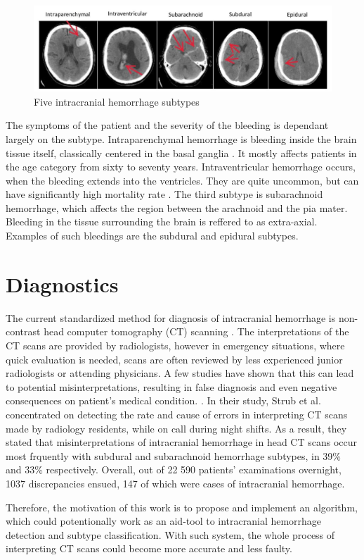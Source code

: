 \begin{figure}[h]
\begin{centering}
\includegraphics[width=14cm]{assets/images/subtypes}
\par\end{centering}
\caption{Five intracranial hemorrhage subtypes \label{fig:subtypes}}
\end{figure}

The symptoms of the patient and the severity of the bleeding is dependant largely on the subtype. Intraparenchymal hemorrhage is bleeding inside the brain tissue itself, classically centered in the basal ganglia \cite{imagingICH}. It mostly affects patients in the age category from sixty to seventy years. Intraventricular hemorrhage occurs, when the bleeding extends into the ventricles. They are quite uncommon, but can have significantly high mortality rate \cite{neuroimagingInTraumaticImageing}. The third subtype is subarachnoid hemorrhage, which affects the region between the arachnoid and the pia mater. Bleeding in the tissue surrounding the brain is reffered to as extra-axial. Examples of such bleedings are the subdural and epidural subtypes.

\section{Diagnostics}
The current standardized method for diagnosis of intracranial hemorrhage is non-contrast head computer tomography (CT) scanning \cite{imagingICH}. The interpretations of the CT scans are provided by radiologists, however in emergency situations, where quick evaluation is needed, scans are often reviewed by less experienced junior radiologists or attending physicians. A few studies have shown that this can lead to potential misinterpretations, resulting in false diagnosis and even negative consequences on patient's medical condition.  \cite{residentEval, overnightCTinterpret}. In their study, Strub et al. \cite{overnightCTinterpret} concentrated on detecting the rate and cause of errors in interpreting CT scans made by radiology residents, while on call during night shifts. As a result, they stated that misinterpretations of intracranial hemorrhage in head CT scans occur most frquently with subdural and subarachnoid hemorrhage subtypes, in 39\% and 33\% respectively. Overall, out of 22 590 patients' examinations overnight, 1037 discrepancies ensued, 147 of which were cases of intracranial hemorrhage.

Therefore, the motivation of this work is to propose and implement an algorithm, which could potentionally work as an aid-tool to intracranial hemorrhage detection and subtype classification. With such system, the whole process of interpreting CT scans could become more accurate and less faulty.
